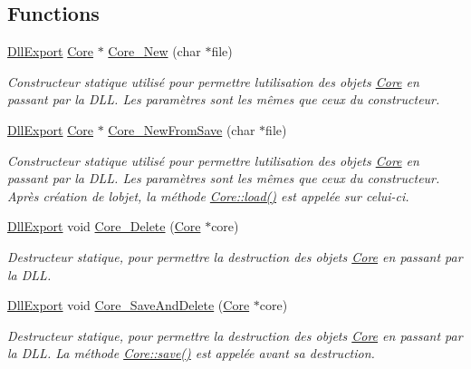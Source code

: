 \subsection*{Functions}
\begin{DoxyCompactItemize}
\item 
\hyperlink{_room_8h_af83a0ad9d707a0bc5fe281b6e5c358a1}{Dll\+Export} \hyperlink{class_e_p_1_1_core}{Core} $\ast$ \hyperlink{namespace_e_p_ac69833e001e1a0be87289b0f414a849d}{Core\+\_\+\+New} (char $\ast$file)
\begin{DoxyCompactList}\small\item\em Constructeur statique utilisé pour permettre l\textquotesingle{}utilisation des objets \hyperlink{class_e_p_1_1_core}{Core} en passant par la D\+LL. Les paramètres sont les mêmes que ceux du constructeur. \end{DoxyCompactList}\item 
\hyperlink{_room_8h_af83a0ad9d707a0bc5fe281b6e5c358a1}{Dll\+Export} \hyperlink{class_e_p_1_1_core}{Core} $\ast$ \hyperlink{namespace_e_p_a3d5379dbee3c6e24e1fd3dc7f1a29dd5}{Core\+\_\+\+New\+From\+Save} (char $\ast$file)
\begin{DoxyCompactList}\small\item\em Constructeur statique utilisé pour permettre l\textquotesingle{}utilisation des objets \hyperlink{class_e_p_1_1_core}{Core} en passant par la D\+LL. Les paramètres sont les mêmes que ceux du constructeur. Après création de l\textquotesingle{}objet, la méthode \hyperlink{class_e_p_1_1_core_ad7adeeffabb5c616d24a66bb10955149}{Core\+::load()} est appelée sur celui-\/ci. \end{DoxyCompactList}\item 
\hyperlink{_room_8h_af83a0ad9d707a0bc5fe281b6e5c358a1}{Dll\+Export} void \hyperlink{namespace_e_p_a34f1031ad31382a4320da08cb4fde987}{Core\+\_\+\+Delete} (\hyperlink{class_e_p_1_1_core}{Core} $\ast$core)
\begin{DoxyCompactList}\small\item\em Destructeur statique, pour permettre la destruction des objets \hyperlink{class_e_p_1_1_core}{Core} en passant par la D\+LL. \end{DoxyCompactList}\item 
\hyperlink{_room_8h_af83a0ad9d707a0bc5fe281b6e5c358a1}{Dll\+Export} void \hyperlink{namespace_e_p_a3d24a1b2346db91ec2e21520fc88f62b}{Core\+\_\+\+Save\+And\+Delete} (\hyperlink{class_e_p_1_1_core}{Core} $\ast$core)
\begin{DoxyCompactList}\small\item\em Destructeur statique, pour permettre la destruction des objets \hyperlink{class_e_p_1_1_core}{Core} en passant par la D\+LL. La méthode \hyperlink{class_e_p_1_1_core_ab89918ae9811065fb1d7d6ff4521ed29}{Core\+::save()} est appelée avant sa destruction. \end{DoxyCompactList}\item 

\end{DoxyCompactItemize}
